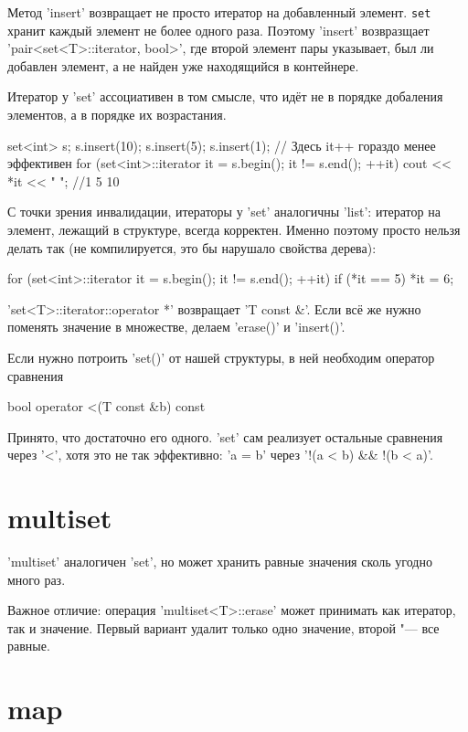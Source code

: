 Метод \cpp'insert' возвращает не просто итератор на добавленный элемент.
\verb'set' хранит каждый элемент не более одного раза.
Поэтому \cpp'insert' возвразщает \cpp'pair<set<T>::iterator, bool>', где второй элемент пары указывает, 
был ли добавлен элемент, а не найден уже находящийся в контейнере.

Итератор у \cpp'set' ассоциативен в том смысле, что идёт не в порядке добаления элементов, а в порядке их возрастания.
\begin{cppcode}
set<int> s;
s.insert(10);
s.insert(5);
s.insert(1);
// Здесь it++ гораздо менее эффективен
for (set<int>::iterator it = s.begin(); it != s.end(); ++it)
	cout << *it << " "; //1 5 10
\end{cppcode}

С точки зрения инвалидации, итераторы у \cpp'set' аналогичны \cpp'list': итератор на элемент, лежащий в структуре, всегда корректен.
Именно поэтому просто нельзя делать так (не компилируется, это бы нарушало свойства дерева):
\begin{cppcode}
for (set<int>::iterator it = s.begin(); it != s.end(); ++it)
	if (*it == 5)
		*it = 6;
\end{cppcode}
\cpp'set<T>::iterator::operator *' возвращает \cpp'T const &'.
Если всё же нужно поменять значение в множестве, делаем \cpp'erase()' и \cpp'insert()'.

Если нужно потроить \cpp'set()' от нашей структуры, в ней необходим оператор сравнения
\begin{cppcode}
bool operator <(T const &b) const
\end{cppcode}
Принято, что достаточно его одного. \cpp'set' сам реализует остальные сравнения через \cpp'<', хотя это не так эффективно:
\cpp'a = b' через \cpp'!(a < b) && !(b < a)'.

\section{multiset}

\cpp'multiset' аналогичен \cpp'set', но может хранить равные значения сколь угодно много раз.

Важное отличие: операция \cpp'multiset<T>::erase' может принимать как итератор, так и значение. Первый вариант удалит только одно значение, второй "--- все равные.

\section{map}

